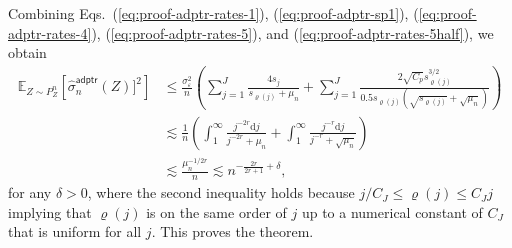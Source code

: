 \documentclass[aos]{imsart}
\renewcommand{\hat}{\widehat}
\newcommand{\ud}{\mathrm d}
\newcommand{\adptr}{\mathsf{adptr}}
\theoremstyle{plain}
\theoremstyle{definition}
\theoremstyle{definition}
\begin{document}
\begin{appendix}
Combining Eqs.~(\ref{eq:proof-adptr-rates-1}), (\ref{eq:proof-adptr-sp1}), (\ref{eq:proof-adptr-rates-4}), (\ref{eq:proof-adptr-rates-5}), and (\ref{eq:proof-adptr-rates-5half}), we obtain
\begin{align*}
\mathbb E_{Z\sim P_Z^n}\left[\hat\sigma_n^\adptr(Z)]^2\right]
&\leq \frac{\sigma_\varepsilon^2}{n}\left(\sum_{j=1}^J\frac{4s_j}{s_{\varrho(j)}+\mu_n} + \sum_{j=1}^J\frac{2\sqrt{C_p}s_{\varrho(j)}^{3/2}}{0.5s_{\varrho(j)}(\sqrt{s_{\varrho(j)}}+\sqrt{\mu_n})}\right)\\
&\lesssim \frac{1}{n}\left(\int_1^{\infty}\frac{j^{-2r}\ud j}{j^{-2r}+\mu_n} + \int_1^{\infty}\frac{j^{-r}\ud j}{j^{-r}+\sqrt{\mu_n}}\right)\\
&\lesssim \frac{\mu_n^{-1/2r}}{n}\lesssim n^{-\frac{2r}{2r+1}+\delta},
\end{align*}
for any $\delta>0$, {\color{magenta}where the second inequality holds because $j/C_J\leq\varrho(j)\leq C_J j$ implying that $\varrho(j)$ is on the same order of $j$ up to a numerical constant of $C_J$
that is uniform for all $j$.}
This proves the theorem.


\end{appendix}



\end{document}
